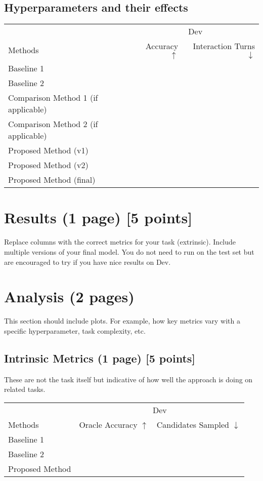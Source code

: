 \documentclass[11pt,a4paper]{article}
\begin{document}
\subsection{Hyperparameters and their effects}

\clearpage
\begin{table}[t]
\centering
\begin{tabular}{@{}lrr@{}}
\toprule
                            & \multicolumn{2}{c}{Dev} \\
Methods                     & Accuracy $\uparrow$ & Interaction Turns $\downarrow$ \\
\midrule
Baseline 1 \cite{} & & \\
Baseline 2 \cite{} & & \\
\midrule
Comparison Method 1 (if applicable) \cite{} & & \\
Comparison Method 2 (if applicable) \cite{} & & \\
\midrule
Proposed Method (v1)            & & \\
Proposed Method (v2)            & & \\
Proposed Method (final)            & & \\
\bottomrule
\end{tabular}
\end{table}
\section{Results (1 page) [5 points]}
Replace columns with the correct metrics for your task (extrinsic). Include multiple versions of your final model.  You do not need to run on the test set but are encouraged to try if you have nice results on Dev.

\clearpage
\section{Analysis (2 pages)}
This section should include plots.  For example, how key metrics vary with a specific hyperparameter, task complexity, etc.

\subsection{Intrinsic Metrics (1 page) [5 points]}
These are not the task itself but indicative of how well the approach is doing on related tasks.
\begin{table}[t]
\centering
\begin{tabular}{@{}lrr@{}}
\toprule
                            & \multicolumn{2}{c}{Dev} \\
Methods                     & Oracle Accuracy $\uparrow$ & Candidates Sampled $\downarrow$  \\
\midrule
Baseline 1 \cite{} & & \\
Baseline 2 \cite{} & & \\
\midrule
Proposed Method             & &  \\
\bottomrule
\end{tabular}
\end{table}
\end{document}
